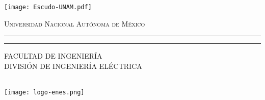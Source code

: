 \documentclass[letterpaper,12pt,oneside]{book}
\begin{document}

    \begin{titlepage}
        \thispagestyle{empty}
        \begin{minipage}[c][0.17\textheight][c]{0.25\textwidth}
            \begin{center}
                \texttt{[image: Escudo-UNAM.pdf]}
            \end{center}
        \end{minipage}
        \begin{minipage}[c][0.195\textheight][t]{0.75\textwidth}
            \begin{center}
                \vspace{0.3cm}
                \textsc{\large Universidad Nacional Aut\'onoma de M\'exico}\\[0.5cm]
                \vspace{0.3cm}
                \hrule height2.5pt
                \vspace{.2cm}
                \hrule height1pt
                \vspace{.8cm}
                \textsc{FACULTAD DE INGENIERÍA\\
DIVISIÓN DE INGENIERÍA ELÉCTRICA }\\[0.5cm] %
            \end{center}
        \end{minipage}

        \begin{minipage}[c][0.81\textheight][t]{0.25\textwidth}
            \vspace*{5mm}
            \begin{center}
                \hskip2.0mm
                \vrule width1pt height13cm 
                \vspace{5mm}
                \hskip2pt
                \vrule width2.5pt height13cm
                \hskip2mm
                \vrule width1pt height13cm \\
                \vspace{5mm}
                \texttt{[image: logo-enes.png]}
            \end{center}
        \end{minipage}
        \begin{minipage}[c][0.81\textheight][t]{0.75\textwidth}
            \begin{center}
                \vspace{1cm}


\end{center}
\end{minipage}
\end{titlepage}
\end{document}
